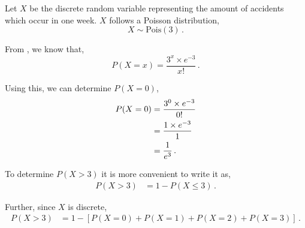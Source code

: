 %
%


\begin{subquestions}
	
\subquestion

Let $X$ be the discrete random variable representing the amount of accidents which occur in one week. $X$ follows a Poisson distribution,
\begin{equation}
	X \sim \text{Pois}(3) \,.
\end{equation}
	
\begin{subsubquestions}
	
\subsubquestion

From , we know that,
\begin{equation}
	P(X = x) =\frac{ 3 ^ x \times e^{-3}}{x!} \,. \label{2011:q4:Poisson1}
\end{equation}
	
Using this, we can determine $P(X=0)$,
\begin{align}
	P(X=0) & = \frac{ 3 ^0 \times e^{-3}}{0!} \nonumber \\
	       & = \frac{ 1 \times e^{-3}}{1} \nonumber \\
	       & = \frac{1}{e^3} \,.
\end{align}
	

\subsubquestion

To determine $P(X>3)$ it is more convenient to write it as,
\begin{align}
	P(X>3) & =1-P(X \leq 3) \,.
\end{align}

Further, since $X$ is discrete,
\begin{align}
	P(X>3)  & = 1 - [P(X=0)+P(X=1)+P(X=2)+P(X=3)] \,. \label{2011:q4:Poisson2}
\end{align}


\end{subsubquestions}
\end{subquestions}
